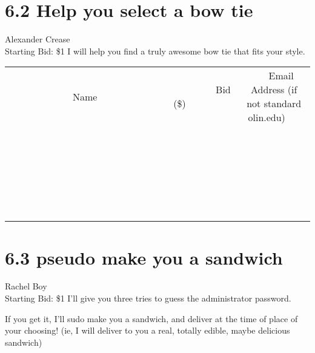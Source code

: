 \documentclass[11pt]{article}
\begin{document}
\section*{6.2 Help you select a bow tie}
Alexander Crease
\\
Starting Bid: \$1
\newline
I will help you find a truly awesome bow tie that fits your style.
\\[6ex]
\begin{tabular}{c c c}
~~~~~~~~~~~~~Name~~~~~~~~~~~~~ & ~~~~~~~~~Bid (\$)~~~~~~~~~  & ~~~Email Address (if not standard olin.edu)~~~\\
 & & \\
\hline
 & & \\
\hline
 & & \\
\hline
 & & \\
\hline
 & & \\
\hline
 & & \\
\hline
 & & \\
\hline
 & & \\
\hline
 & & \\
\hline
 & & \\
\hline
 & & \\
\hline
 & & \\
\hline
 & & \\
\hline
 & & \\
\hline
 & & \\
\hline
 & & \\
\hline
 & & \\
\hline
 & & \\
\hline
 & & \\
\hline
 & & \\
\hline
 & & \\
\hline
 & & \\
\hline
 & & \\
\hline
 & & \\
\hline
 & & \\
\hline
 & & \\
\hline
\end{tabular}
\newpage
\section*{6.3 pseudo make you a sandwich}
Rachel Boy
\\
Starting Bid: \$1
\newline
I'll give you three tries to guess the administrator password.  

If you get it, I'll sudo make you a sandwich, and deliver at the time of place of your choosing! (ie, I will deliver to you a real, totally edible, maybe delicious sandwich) 
\end{document}
